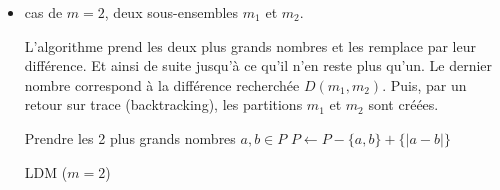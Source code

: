\documentclass[a4paper,12pt]{report}
\theoremstyle{plain}				%
\theoremstyle{definition}				%
\begin{document}
\begin{itemize}
\item cas de $m=2$, deux sous-ensembles $m_1$ et $m_2$.

  L'algorithme prend les deux plus grands nombres et les remplace par leur
  différence. Et ainsi de suite jusqu'à ce qu'il n'en reste plus
  qu'un.
  Le dernier nombre correspond à la différence recherchée
  $D(m_1, m_2)$.
  Puis, par un retour sur trace (backtracking), les partitions $m_1$
  et $m_2$ sont créées.

\bigskip

\begin{algorithm}
\DontPrintSemicolon
{}


\BlankLine %
{
	Prendre les 2 plus grands nombres $a,b \in P$  \;
	$P \leftarrow P - \{a, b\} + \{ \lvert a-b \rvert \}$\;

} 

\caption{LDM ($m=2$)\label{algo:LDM2}}
\end{algorithm}


\bigskip


\end{itemize}
\end{document}
